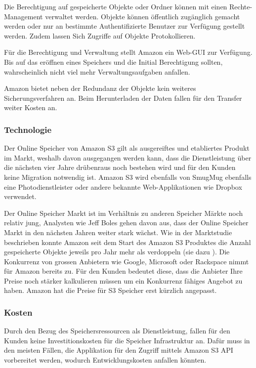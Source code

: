 Die Berechtigung auf gespeicherte Objekte oder Ordner können mit einen Rechte-Management verwaltet werden. Objekte können öffentlich zugänglich gemacht werden oder nur an bestimmte Authentifizierte Benutzer zur Verfügung gestellt werden. Zudem lassen Sich Zugriffe auf Objekte Protokollieren.\cite{Amazon2012b}

Für die Berechtigung und Verwaltung stellt Amazon ein Web-GUI zur Verfügung. Bis auf das eröffnen eines Speichers und die Initial Berechtigung sollten, wahrscheinlich nicht viel mehr Verwaltungsaufgaben anfallen.

Amazon bietet neben der Redundanz der Objekte kein weiteres Sicherungsverfahren an. Beim Herunterladen der Daten fallen für den Transfer weiter Kosten an.

\subsubsection*{Technologie}
Der Online Speicher von Amazon S3 gilt als ausgereiftes und etabliertes Produkt im Markt, weshalb davon ausgegangen werden kann, dass die Dienstleistung über die nächsten vier Jahre drübenraus noch bestehen wird und für den Kunden keine Migration notwendig ist. Amazon S3 wird ebenfalls von SmugMug ebenfalls eine Photodienstleister oder andere bekannte Web-Applikationen wie Dropbox verwendet.\cite{SmugMug}\cite{Dropbox2011}

Der Online Speicher Markt ist im Verhältnis zu anderen Speicher Märkte noch relativ jung, Analysten wie Jeff Boles gehen davon aus, dass der Online Speicher Markt in den nächsten Jahren weiter stark wächst. Wie in der Marktstudie beschrieben konnte Amazon seit dem Start des Amazon S3 Produktes die Anzahl gespeicherte Objekte jeweils pro Jahr mehr als verdoppeln (sie dazu ). Die Konkurrenz von grossen Anbietern wie Google, Microsoft oder Rackspace nimmt für Amazon bereits zu. Für den Kunden bedeutet diese, dass die Anbieter Ihre Preise noch stärker kalkulieren müssen um ein Konkurrenz fähiges Angebot zu haben. Amazon hat die Preise für S3 Speicher erst kürzlich angepasst.\cite{Boles2011}\cite{Barr2012a}


\subsubsection*{Kosten}
Durch den Bezug des Speichersressourcen als Dienstleistung, fallen für den Kunden keine Investitionskosten für die Speicher Infrastruktur an.
Dafür muss in den meisten Fällen, die Applikation für den Zugriff mittels Amazon S3 API vorbereitet werden, wodurch Entwicklungskosten anfallen könnten.

